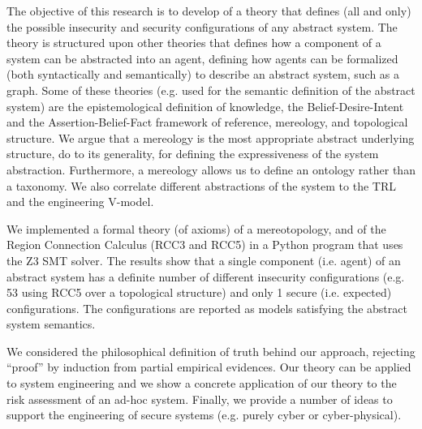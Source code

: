 The objective of this research is to develop of a theory that defines
(all and only) the possible insecurity and security configurations of
any abstract system. The theory is structured upon other theories that 
defines how a component of a system can be abstracted into an agent, defining how
agents can be formalized (both syntactically and semantically) to
describe an abstract system, such as a graph. Some of these theories
(e.g. used for the semantic
definition of the abstract system) are the epistemological definition
of knowledge, the Belief-Desire-Intent and the Assertion-Belief-Fact 
framework of reference, 
mereology, and topological structure. We argue that a mereology is the
most appropriate abstract underlying structure, do to its generality,
for defining the expressiveness of the system abstraction.  Furthermore, a
mereology allows us to define an ontology rather than a taxonomy.  We
also correlate different abstractions of the system to the TRL and the
engineering V-model. 

We implemented a formal theory (of axioms) of a mereotopology, and of
the Region Connection Calculus (RCC3 and RCC5) in a Python program that
uses the Z3 SMT solver. The results show that a single component (i.e.
agent) of an abstract system has a definite number of  different
insecurity configurations (e.g. 53 using RCC5 over a topological
structure) and only 1 secure (i.e. expected) configurations. The
configurations are reported as models satisfying the abstract system
semantics. 

We considered the philosophical definition of truth behind our
approach, rejecting ``proof'' by induction from partial empirical evidences.
Our theory can be applied to system engineering and we show a concrete
application of our theory to the risk assessment of an ad-hoc system.
Finally, we provide a number of ideas to support the engineering of
secure systems (e.g. purely cyber or cyber-physical).
